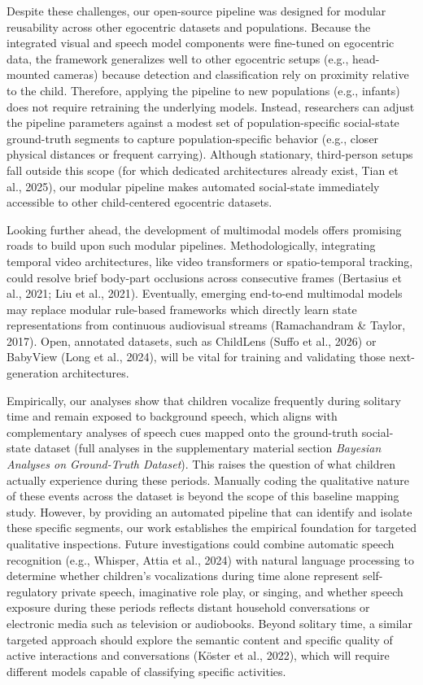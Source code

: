\documentclass[
  english,
  12pt,
  man,floatsintext]{apa6}
\begin{document}
Despite these challenges, our open-source pipeline was designed for modular reusability across other egocentric datasets and populations. Because the integrated visual and speech model components were fine-tuned on egocentric data, the framework generalizes well to other egocentric setups (e.g., head-mounted cameras) because detection and classification rely on proximity relative to the child. Therefore, applying the pipeline to new populations (e.g., infants) does not require retraining the underlying models. Instead, researchers can adjust the pipeline parameters against a modest set of population-specific social-state ground-truth segments to capture population-specific behavior (e.g., closer physical distances or frequent carrying). Although stationary, third-person setups fall outside this scope (for which dedicated architectures already exist, Tian et al., 2025), our modular pipeline makes automated social-state immediately accessible to other child-centered egocentric datasets.

Looking further ahead, the development of multimodal models offers promising roads to build upon such modular pipelines. Methodologically, integrating temporal video architectures, like video transformers or spatio-temporal tracking, could resolve brief body-part occlusions across consecutive frames (Bertasius et al., 2021; Liu et al., 2021). Eventually, emerging end-to-end multimodal models may replace modular rule-based frameworks which directly learn state representations from continuous audiovisual streams (Ramachandram \& Taylor, 2017). Open, annotated datasets, such as ChildLens (Suffo et al., 2026) or BabyView (Long et al., 2024), will be vital for training and validating those next-generation architectures.

Empirically, our analyses show that children vocalize frequently during solitary time and remain exposed to background speech, which aligns with complementary analyses of speech cues mapped onto the ground-truth social-state dataset (full analyses in the supplementary material section \emph{Bayesian Analyses on Ground-Truth Dataset}). This raises the question of what children actually experience during these periods. Manually coding the qualitative nature of these events across the dataset is beyond the scope of this baseline mapping study. However, by providing an automated pipeline that can identify and isolate these specific segments, our work establishes the empirical foundation for targeted qualitative inspections. Future investigations could combine automatic speech recognition (e.g., Whisper, Attia et al., 2024) with natural language processing to determine whether children's vocalizations during time alone represent self-regulatory private speech, imaginative role play, or singing, and whether speech exposure during these periods reflects distant household conversations or electronic media such as television or audiobooks. Beyond solitary time, a similar targeted approach should explore the semantic content and specific quality of active interactions and conversations (Köster et al., 2022), which will require different models capable of classifying specific activities.
\end{document}
